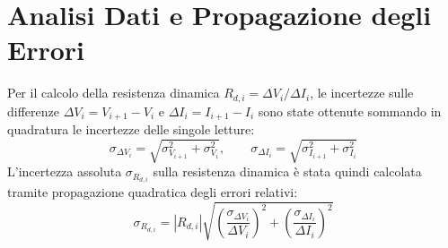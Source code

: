 \documentclass[a4paper,11pt]{article}
\begin{document}
\section{Analisi Dati e Propagazione degli Errori}
Per il calcolo della resistenza dinamica $R_{d,i} = \Delta V_i / \Delta I_i$, le incertezze sulle differenze $\Delta V_i = V_{i+1} - V_i$ e $\Delta I_i = I_{i+1} - I_i$ sono state ottenute sommando in quadratura le incertezze delle singole letture:
\begin{equation*}
    \sigma_{\Delta V_i} = \sqrt{\sigma_{V_{i+1}}^2 + \sigma_{V_i}^2}, \qquad \sigma_{\Delta I_i} = \sqrt{\sigma_{I_{i+1}}^2 + \sigma_{I_i}^2}
\end{equation*}
L'incertezza assoluta $\sigma_{R_{d,i}}$ sulla resistenza dinamica è stata quindi calcolata tramite propagazione quadratica degli errori relativi:
\begin{equation*}
    \sigma_{R_{d,i}} = |R_{d,i}| \sqrt{\left(\frac{\sigma_{\Delta V_i}}{\Delta V_i}\right)^2 + \left(\frac{\sigma_{\Delta I_i}}{\Delta I_i}\right)^2}
\end{equation*}
\end{document}
